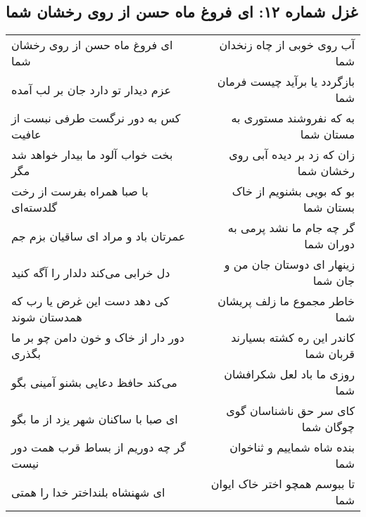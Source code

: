 \begin{center}
\section*{غزل شماره ۱۲: ای فروغ ماه حسن از روی رخشان شما}
\label{sec:sh012}
\begin{longtable}{l p{0.5cm} r}
ای فروغ ماه حسن از روی رخشان شما
&&
آب روی خوبی از چاه زنخدان شما
\\
عزم دیدار تو دارد جان بر لب آمده
&&
بازگردد یا برآید چیست فرمان شما
\\
کس به دور نرگست طرفی نبست از عافیت
&&
به که نفروشند مستوری به مستان شما
\\
بخت خواب آلود ما بیدار خواهد شد مگر
&&
زان که زد بر دیده آبی روی رخشان شما
\\
با صبا همراه بفرست از رخت گلدسته‌ای
&&
بو که بویی بشنویم از خاک بستان شما
\\
عمرتان باد و مراد ای ساقیان بزم جم
&&
گر چه جام ما نشد پرمی به دوران شما
\\
دل خرابی می‌کند دلدار را آگه کنید
&&
زینهار ای دوستان جان من و جان شما
\\
کی دهد دست این غرض یا رب که همدستان شوند
&&
خاطر مجموع ما زلف پریشان شما
\\
دور دار از خاک و خون دامن چو بر ما بگذری
&&
کاندر این ره کشته بسیارند قربان شما
\\
می‌کند حافظ دعایی بشنو آمینی بگو
&&
روزی ما باد لعل شکرافشان شما
\\
ای صبا با ساکنان شهر یزد از ما بگو
&&
کای سر حق ناشناسان گوی چوگان شما
\\
گر چه دوریم از بساط قرب همت دور نیست
&&
بنده شاه شماییم و ثناخوان شما
\\
ای شهنشاه بلنداختر خدا را همتی
&&
تا ببوسم همچو اختر خاک ایوان شما
\\
\end{longtable}
\end{center}
